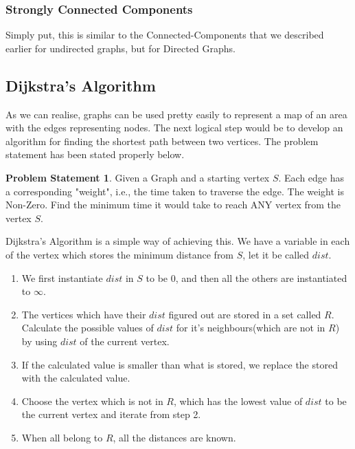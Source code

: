 \documentclass{article}
\theoremstyle{definition}
\theoremstyle{example}
\newtheorem*{example}{Problem Statement}
\begin{document}
\subsubsection*{\Large Strongly Connected Components}
\hspace{4mm} Simply put, this is similar to the Connected-Components that we described earlier for undirected graphs, but for Directed Graphs. 

\subsection{\Large Dijkstra's Algorithm}
\hspace{4mm} As we can realise, graphs can be used pretty easily to represent a map of an area with the edges representing nodes. The next logical step would be to develop an algorithm for finding the shortest path between two vertices. The problem statement has been stated properly below.

\theoremstyle{example}
\begin{example}
    Given a Graph and a starting vertex $S$. Each edge has a corresponding "weight", i.e., the time taken to traverse the edge. The weight is Non-Zero. Find the minimum time it would take to reach ANY vertex from the vertex $S$.
\end{example}

Dijkstra's Algorithm is a simple way of achieving this. We have a variable in each of the vertex which stores the minimum distance from $S$, let it be called $dist$.

\begin{enumerate}
    \item We first instantiate $dist$ in $S$ to be $0$, and then all the others are instantiated to $\infty$.
    \item The vertices which have their $dist$ figured out are stored in a set called $R$. Calculate the possible values of $dist$ for it's neighbours(which are not in $R$) by using $dist$ of the current vertex.
    \item  If the calculated value is smaller than what is stored, we replace the stored with the calculated value.
    \item Choose the vertex which is not in $R$, which has the lowest value of $dist$ to be the current vertex and iterate from step 2.
    \item When all belong to $R$, all the distances are known.
\end{enumerate}
\end{document}
